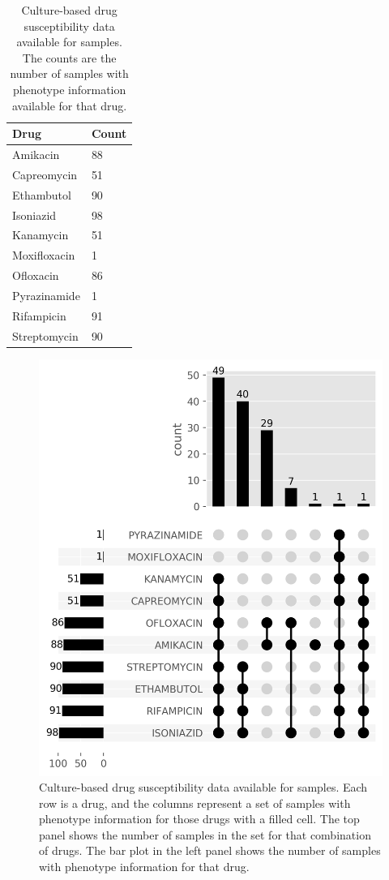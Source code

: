 \begin{table}
\centering
\begin{tabular}{@{}ll@{}}
\toprule
Drug         & Count \\ \midrule
Amikacin     & 88    \\
Capreomycin  & 51    \\
Ethambutol   & 90    \\
Isoniazid    & 98    \\
Kanamycin    & 51    \\
Moxifloxacin & 1     \\
Ofloxacin    & 86    \\
Pyrazinamide & 1     \\
Rifampicin   & 91    \\
Streptomycin & 90    \\ \bottomrule
\end{tabular}
\caption{Culture-based drug susceptibility data available for samples. The counts are the number of samples with phenotype information available for that drug.}
\label{tab:available-dst}
\end{table}

\begin{figure}
\begin{center}
\includegraphics[width=0.90\columnwidth]{Chapter3/Figs/available_dst.png}
\caption{{Culture-based drug susceptibility data available for samples. Each row is a drug, and the columns represent a set of samples with phenotype information for those drugs with a filled cell. The top panel shows the number of samples in the set for that combination of drugs. The bar plot in the left panel shows the number of samples with phenotype information for that drug.
{\label{fig:available-dst}}
}}
\end{center}
\end{figure}
